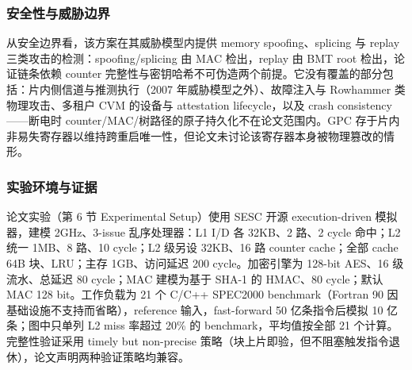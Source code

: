 \documentclass[11pt]{ctexart}
\begin{document}
\subsubsection{安全性与威胁边界}
从安全边界看，该方案在其威胁模型内提供 memory spoofing、splicing 与 replay 三类攻击的检测：spoofing/splicing 由 MAC 检出，replay 由 BMT root 检出，论证链条依赖 counter 完整性与密钥哈希不可伪造两个前提。它没有覆盖的部分包括：片内侧信道与推测执行（2007 年威胁模型之外）、故障注入与 Rowhammer 类物理攻击、多租户 CVM 的设备与 attestation lifecycle，以及 crash consistency——断电时 counter/MAC/树路径的原子持久化不在论文范围内。GPC 存于片内非易失寄存器以维持跨重启唯一性，但论文未讨论该寄存器本身被物理篡改的情形。\par
\subsubsection{实验环境与证据}
论文实验（第 6 节 Experimental Setup）使用 SESC 开源 execution-driven 模拟器，建模 2GHz、3-issue 乱序处理器：L1 I/D 各 32KB、2 路、2 cycle 命中；L2 统一 1MB、8 路、10 cycle；L2 级另设 32KB、16 路 counter cache；全部 cache 64B 块、LRU；主存 1GB、访问延迟 200 cycle。加密引擎为 128-bit AES、16 级流水、总延迟 80 cycle；MAC 建模为基于 SHA-1 的 HMAC、80 cycle；默认 MAC 128 bit。工作负载为 21 个 C/C++ SPEC2000 benchmark（Fortran 90 因基础设施不支持而省略），reference 输入，fast-forward 50 亿条指令后模拟 10 亿条；图中只单列 L2 miss 率超过 20\% 的 benchmark，平均值按全部 21 个计算。完整性验证采用 timely but non-precise 策略（块上片即验，但不阻塞触发指令退休），论文声明两种验证策略均兼容。\par
\end{document}
